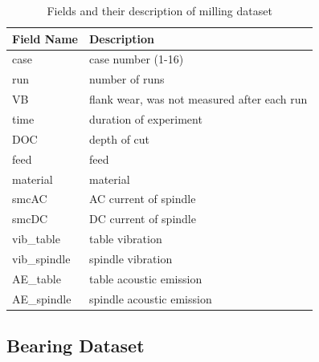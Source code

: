 \begin{table}[ht]
    \centering
    \begin{tabular}{| l | l | }
        \hline
        \textbf{Field Name} & \textbf{Description}                        \\
        \hline
        case                & case number (1-16)                          \\
        \hline
        run                 & number of runs                              \\
        \hline
        VB                  & flank wear, was not measured after each run \\
        \hline
        time                & duration of experiment                      \\
        \hline
        DOC                 & depth of cut                                \\
        \hline
        feed                & feed                                        \\
        \hline
        material            & material                                    \\
        \hline
        smcAC               & AC current of spindle                       \\
        \hline
        smcDC               & DC current of spindle                       \\
        \hline
        vib\_table          & table vibration                             \\
        \hline
        vib\_spindle        & spindle vibration                           \\
        \hline
        AE\_table           & table acoustic emission                     \\
        \hline
        AE\_spindle         & spindle acoustic emission                   \\
        \hline
    \end{tabular}
    \vspace{0.3cm}
    \captionsetup{justification=centering}
    \caption{Fields and their description of milling dataset}
    \label{sec:hi_estimation:datasets:milling_table}
\end{table}




\subsection{Bearing Dataset}
\label{sec:hi_estimation:datasets:bearing_dataset}


